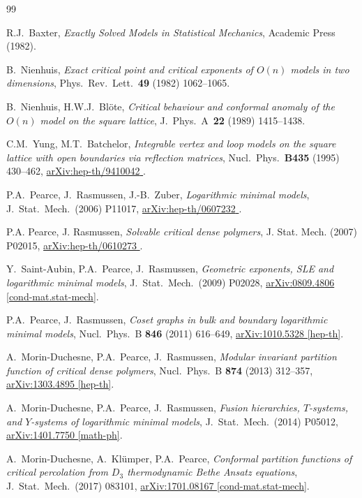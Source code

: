 \documentclass[11pt]{article}
\numberwithin{equation}{section}
\theoremstyle{definition}
\numberwithin{equation}{section}
\def\arxiv#1#2{\href{http://arxiv.org/abs/#1}{\textsf{arXiv:#1 #2}}}
\begin{document}
%
\begin{thebibliography}{99}
%

	R.J.~Baxter, 
	{\it Exactly Solved Models in Statistical Mechanics},
	Academic Press (1982).
	
	B.~Nienhuis, 
	{\em Exact critical point and critical exponents of $O(n)$ models in two dimensions},
	Phys.~Rev.~Lett.~{\bf 49} (1982) 1062--1065.
	
	B.~Nienhuis, H.W.J.~Bl\"ote,
	{\em Critical behaviour and conformal anomaly of the $O(n)$ model on the square lattice},
	J.~Phys.~A~{\bf 22} (1989) 1415--1438.
	
	C.M.~Yung, M.T.~Batchelor,
	{\em Integrable vertex and loop models on the square lattice with open boundaries via reflection matrices},
	Nucl.~Phys.~{\bf B435} (1995) 430--462,
	\arxiv{hep-th/9410042}{\!\!}.
	
	P.A.~Pearce, J.~Rasmussen, J.-B.~Zuber,
	{\em Logarithmic minimal models}, 
	 J.~Stat.~Mech.~(2006) P11017, \arxiv{hep-th/0607232}{\!\!}.
	 
	P.A. Pearce, J. Rasmussen, 
	{\em Solvable critical dense polymers},
	J. Stat. Mech. (2007) P02015,
	\arxiv{hep-th/0610273}{\!\!}.
 
	Y.~Saint-Aubin, P.A.~Pearce, J.~Rasmussen,
	{\em Geometric exponents, SLE and logarithmic minimal models}, 
	J.~Stat.~Mech.~(2009) P02028, 
	\arxiv{0809.4806}{[cond-mat.stat-mech]}.
	
	P.A.~Pearce, J.~Rasmussen, 
	{\em Coset graphs in bulk and boundary logarithmic minimal models}, 
	Nucl.~Phys.~B {\bf 846} (2011) 616--649,
	\arxiv{1010.5328}{[hep-th]}.	
	
	A.~Morin-Duchesne, P.A.~Pearce, J.~Rasmussen, 
	{\em Modular invariant partition function of critical dense polymers}, 
	Nucl.~Phys.~B {\bf 874} (2013) 312--357,
	\arxiv{1303.4895}{[hep-th]}.

	A.~Morin-Duchesne, P.A.~Pearce, J.~Rasmussen,
	{\em Fusion hierarchies, $T$-systems, and $Y$-systems of logarithmic minimal models}, 
	J.~Stat.~Mech.~(2014) P05012,
	\arxiv{1401.7750}{[math-ph]}.

	A.~Morin-Duchesne, A.~Kl\"umper, P.A.~Pearce, 
	{\em Conformal partition functions of critical percolation from $D_3$ thermodynamic Bethe Ansatz equations}, 
	J.~Stat.~Mech.~(2017) 083101,
	\arxiv{1701.08167}{[cond-mat.stat-mech]}.
		

\end{thebibliography}
\end{document}
